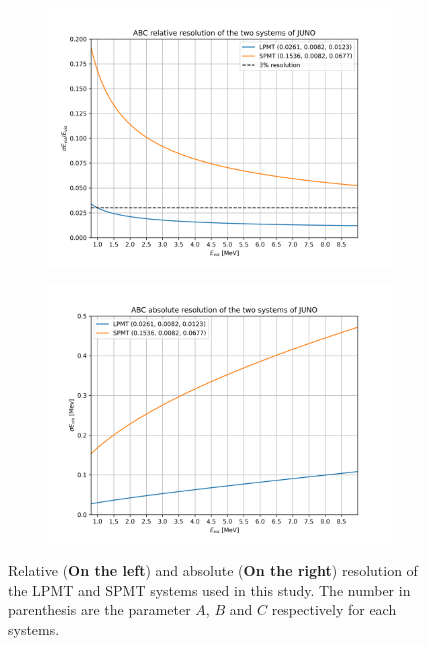 \documentclass[../main.tex]{subfiles}
\begin{document}
\begin{figure}[ht]
  \centering
  \begin{subfigure}[t]{0.48\linewidth}
    \includegraphics[width=\linewidth]{scripts/plots/relative_resolution.png}
  \end{subfigure}
  \hfill
  \begin{subfigure}[t]{0.48\linewidth}
    \includegraphics[width=\linewidth]{scripts/plots/absolute_resolution.png}
  \end{subfigure}
  \caption{Relative (\textbf{On the left}) and absolute (\textbf{On the right}) resolution of the LPMT and SPMT systems used in this study. The number in parenthesis are the parameter $A$, $B$ and $C$ respectively for each systems.}
  \label{fig:joint_fit:system_resolution}
\end{figure}
\end{document}
